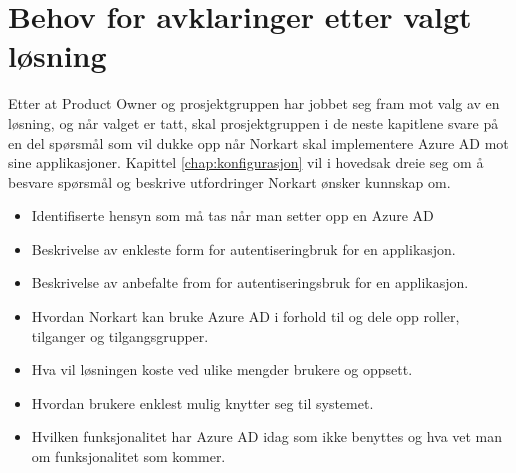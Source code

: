 \section{Behov for avklaringer etter valgt løsning}
\label{sec:valgAvLosing_behovForAvklaringerEtterValgtLosning}
Etter at Product Owner og prosjektgruppen har jobbet seg fram mot valg av en løsning, og når valget er tatt, skal prosjektgruppen i de neste kapitlene svare på en del spørsmål som vil dukke opp når Norkart skal implementere Azure AD mot sine applikasjoner. Kapittel \ref{chap:konfigurasjon} vil i hovedsak dreie seg om å besvare spørsmål og beskrive utfordringer Norkart ønsker kunnskap om.

\begin{itemize}
\item Identifiserte hensyn som må tas når man setter opp en Azure AD
\item Beskrivelse av enkleste form for autentiseringbruk for en applikasjon.
\item Beskrivelse av anbefalte from for autentiseringsbruk for en applikasjon.
\item Hvordan Norkart kan bruke Azure AD i forhold til og dele opp roller, tilganger og tilgangsgrupper.
\item Hva vil løsningen koste ved ulike mengder brukere og oppsett. 
\item Hvordan brukere enklest mulig knytter seg til systemet.
\item Hvilken funksjonalitet har Azure AD idag som ikke benyttes og hva vet man om funksjonalitet som kommer. 
\end{itemize}